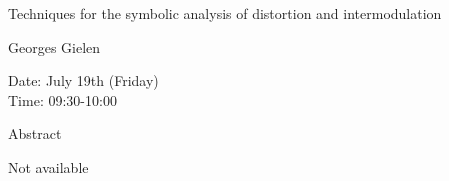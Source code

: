 \begin{center}
\LARGE
Techniques for the symbolic analysis of distortion and intermodulation

\end{center}

\begin{center}
\Large
Georges Gielen
\end{center}

\noindent
Date:  July 19th (Friday) \\
Time: 09:30-10:00\\

\begin{center}
\large
Abstract
\end{center}

Not available